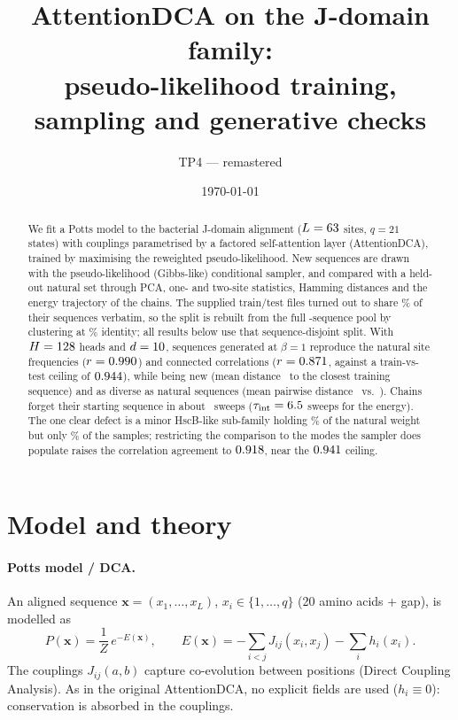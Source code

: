 \documentclass[10pt,a4paper]{article}
\title{AttentionDCA on the J-domain family:\\ pseudo-likelihood training, sampling and generative checks}
\author{TP4 --- remastered}
\date{\today}
\begin{document}
\maketitle

\begin{abstract}
We fit a Potts model to the bacterial J-domain alignment ($L=63$ sites, $q=21$ states)
with couplings parametrised by a factored self-attention layer (AttentionDCA), trained by
maximising the reweighted pseudo-likelihood. New sequences are drawn with the
pseudo-likelihood (Gibbs-like) conditional sampler, and compared with a held-out natural set
through PCA, one- and two-site statistics, Hamming distances and the energy trajectory of the chains.
The supplied train/test files turned out to share \CmpPctCopies\% of their sequences verbatim, so the
split is rebuilt from the full \NsuperSet-sequence pool by clustering at \SplitIdent\% identity;
all results below use that sequence-disjoint split.
With $H=128$ heads and $d=10$, sequences generated at $\beta=1$ reproduce the natural
site frequencies ($r=0.990$) and connected correlations ($r=0.871$, against a train-vs-test
ceiling of $0.944$), while being new (mean distance \HamGTrOne\ to the closest training
sequence) and as diverse as natural sequences (mean pairwise distance
\HamGGOne\ vs.\ \HamTestTest). Chains forget their starting sequence in about \SweepsNinetyOne\
sweeps ($\tau_\text{int}=6.5$ sweeps for the energy). The one clear defect is a minor
HscB-like sub-family holding \ClTest\% of the natural weight but only \ClOne\% of the samples;
restricting the comparison to the modes the sampler does populate raises the correlation
agreement to $0.918$, near the $0.941$ ceiling.
\end{abstract}

\section{Model and theory}
\paragraph{Potts model / DCA.}
An aligned sequence $\bm x=(x_1,\dots,x_L)$, $x_i\in\{1,\dots,q\}$ (20 amino acids + gap),
is modelled as
\begin{equation}
P(\bm x)=\frac{1}{Z}\,e^{-E(\bm x)},\qquad
E(\bm x)=-\sum_{i<j}J_{ij}(x_i,x_j)-\sum_i h_i(x_i).
\end{equation}
The couplings $J_{ij}(a,b)$ capture co-evolution between positions (Direct Coupling Analysis).
As in the original AttentionDCA, no explicit fields are used ($h_i\equiv0$): conservation is absorbed in the couplings.
\end{document}
